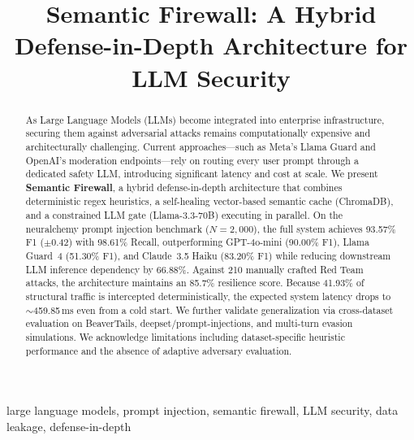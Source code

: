 \documentclass[conference]{IEEEtran}
\begin{document}
\title{Semantic Firewall: A Hybrid Defense-in-Depth Architecture for LLM Security}

\author{
}

\maketitle

\begin{abstract}
As Large Language Models (LLMs) become integrated into enterprise infrastructure, securing them against adversarial attacks remains computationally expensive and architecturally challenging. Current approaches---such as Meta's Llama Guard and OpenAI's moderation endpoints---rely on routing every user prompt through a dedicated safety LLM, introducing significant latency and cost at scale. We present \textbf{Semantic Firewall}, a hybrid defense-in-depth architecture that combines deterministic regex heuristics, a self-healing vector-based semantic cache (ChromaDB), and a constrained LLM gate (Llama-3.3-70B) executing in parallel. On the neuralchemy prompt injection benchmark ($N{=}2{,}000$), the full system achieves 93.57\% F1 ($\pm$0.42) with 98.61\% Recall, outperforming GPT-4o-mini (90.00\% F1), Llama Guard~4 (51.30\% F1), and Claude~3.5 Haiku (83.20\% F1) while reducing downstream LLM inference dependency by 66.88\%. Against 210 manually crafted Red Team attacks, the architecture maintains an 85.7\% resilience score. Because 41.93\% of structural traffic is intercepted deterministically, the expected system latency drops to $\sim$459.85\,ms even from a cold start. We further validate generalization via cross-dataset evaluation on BeaverTails, deepset/prompt-injections, and multi-turn evasion simulations. We acknowledge limitations including dataset-specific heuristic performance and the absence of adaptive adversary evaluation.
\end{abstract}

\begin{IEEEkeywords}
large language models, prompt injection, semantic firewall, LLM security, data leakage, defense-in-depth
\end{IEEEkeywords}

\end{document}
